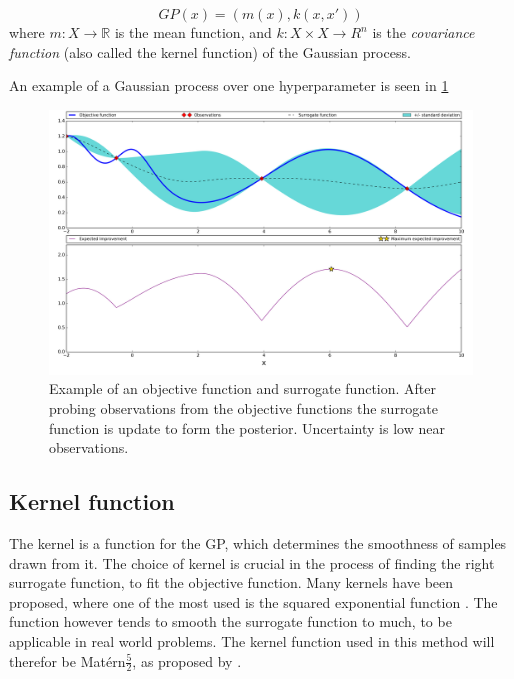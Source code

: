 \begin{equation}\label{gaussian-process}
GP(x) = (m(x), k(x, x'))
\end{equation}
where $m : X \rightarrow \mathbb{R}$ is the mean function, and $k : X \times X \rightarrow R^n$ is the \emph{covariance function} (also called the kernel function) of the Gaussian process.

An example of a Gaussian process over one hyperparameter is seen in \cref{fig:bayesian-optimization}
\begin{figure}%
	\centering
	\includegraphics[width=1\textwidth]{figures/BO.png}
	\vspace{-2em}
	\caption{Example of an objective function and surrogate function. After probing observations from the objective functions the surrogate function is update to form the posterior. Uncertainty is low near observations.}
	\label{fig:bayesian-optimization}
\end{figure}

\subsection{Kernel function}
The kernel is a function for the GP, which determines the smoothness of samples drawn from it. The choice of kernel is crucial in the process of finding the right surrogate function, to fit the objective function. Many kernels have been proposed, where one of the most used is the squared exponential function \citet{brochu2010tutorial}. The function however tends to smooth the surrogate function to much, to be applicable in real world problems. The kernel function used in this method will therefor be Matérn$\frac{5}{2}$, as proposed by \citet{snoek2012practical}.

